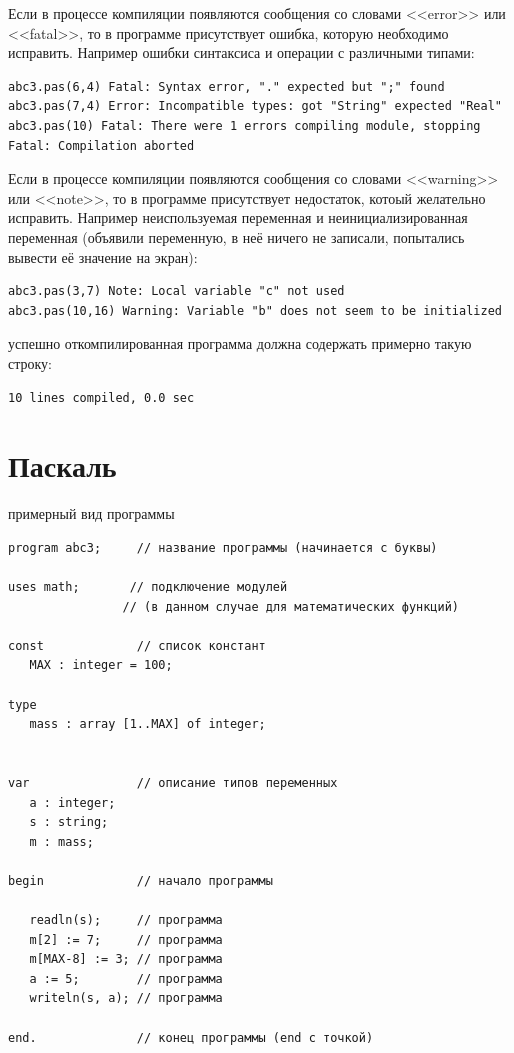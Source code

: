 \documentclass[unicode, 12pt, a4paper,oneside,fleqn]{article}
\begin{document}
Если в процессе компиляции появляются сообщения со словами <<error>>
или <<fatal>>, то в программе присутствует ошибка, которую необходимо
исправить. Например ошибки синтаксиса и операции с различными типами:
{\tiny
\begin{verbatim}
abc3.pas(6,4) Fatal: Syntax error, "." expected but ";" found
abc3.pas(7,4) Error: Incompatible types: got "String" expected "Real"
abc3.pas(10) Fatal: There were 1 errors compiling module, stopping
Fatal: Compilation aborted
\end{verbatim}
}

Если в процессе компиляции появляются сообщения со словами
<<warning>> или <<note>>, то в программе присутствует недостаток,
котоый желательно исправить. Например неиспользуемая переменная и
неинициализированная переменная (объявили переменную, в неё ничего не
записали, попытались вывести её значение на экран):
{\tiny
\begin{verbatim}
abc3.pas(3,7) Note: Local variable "c" not used
abc3.pas(10,16) Warning: Variable "b" does not seem to be initialized
\end{verbatim}
}

успешно откомпилированная программа должна содержать примерно такую строку:
\begin{verbatim}
10 lines compiled, 0.0 sec
\end{verbatim}


\section{Паскаль}
примерный вид программы

\begin{verbatim}
program abc3;     // название программы (начинается с буквы)

uses math;       // подключение модулей
                // (в данном случае для математических функций)

const             // список констант
   MAX : integer = 100;  

type
   mass : array [1..MAX] of integer;


var               // описание типов переменных
   a : integer;
   s : string;
   m : mass;

begin             // начало программы

   readln(s);     // программа
   m[2] := 7;     // программа
   m[MAX-8] := 3; // программа
   a := 5;        // программа
   writeln(s, a); // программа
   
end.              // конец программы (end с точкой)

\end{verbatim}
\end{document}
